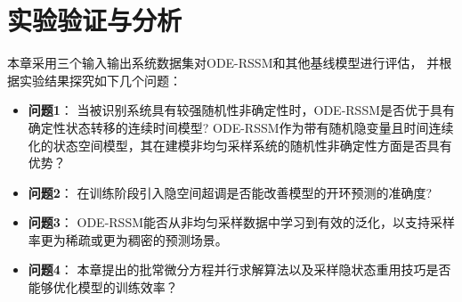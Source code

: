 \section{实验验证与分析}
\label{sec:5_experiment}
本章采用三个输入输出系统数据集对ODE-RSSM和其他基线模型进行评估，
并根据实验结果探究如下几个问题：
\begin{itemize}
\item \textbf{问题1}：
当被识别系统具有较强随机性非确定性时，ODE-RSSM是否优于具有确定性状态转移的连续时间模型?
ODE-RSSM作为带有随机隐变量且时间连续化的状态空间模型，其在建模非均匀采样系统的随机性非确定性方面是否具有优势？
\item \textbf{问题2}：
在训练阶段引入隐空间超调是否能改善模型的开环预测的准确度?
\item \textbf{问题3}： 
ODE-RSSM能否从非均匀采样数据中学习到有效的泛化，以支持采样率更为稀疏或更为稠密的预测场景。
\item \textbf{问题4}： 本章提出的批常微分方程并行求解算法以及采样隐状态重用技巧是否能够优化模型的训练效率？
\end{itemize}

